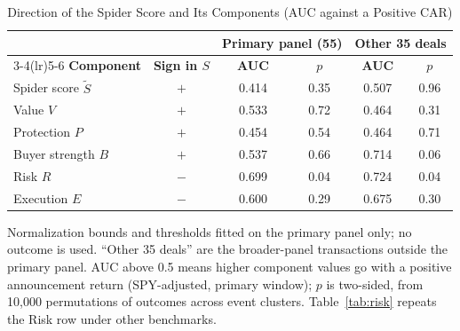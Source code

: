 \begin{table}[!t]
\caption{Direction of the Spider Score and Its Components (AUC against a Positive CAR)}
\label{tab:components}
\centering
\footnotesize
\setlength{\tabcolsep}{3pt}
\begin{tabular}{lccccc}
\toprule
 & & \multicolumn{2}{c}{\textbf{Primary panel (55)}} & \multicolumn{2}{c}{\textbf{Other 35 deals}} \\
\cmidrule(lr){3-4}\cmidrule(lr){5-6}
\textbf{Component} & \textbf{Sign in $S$} & \textbf{AUC} & \textbf{$p$} & \textbf{AUC} & \textbf{$p$} \\
\midrule
Spider score $\tilde S$ & $+$ & 0.414 & 0.35 & 0.507 & 0.96 \\
Value $V$ & $+$ & 0.533 & 0.72 & 0.464 & 0.31 \\
Protection $P$ & $+$ & 0.454 & 0.54 & 0.464 & 0.71 \\
Buyer strength $B$ & $+$ & 0.537 & 0.66 & 0.714 & 0.06 \\
Risk $R$ & $-$ & 0.699 & 0.04 & 0.724 & 0.04 \\
Execution $E$ & $-$ & 0.600 & 0.29 & 0.675 & 0.30 \\
\bottomrule
\end{tabular}
\par\vspace{2pt}\parbox{0.94\columnwidth}{\scriptsize Normalization bounds and thresholds fitted on the primary panel only; no outcome
is used. ``Other 35 deals'' are the broader-panel transactions outside the primary panel. AUC above 0.5 means
higher component values go with a positive announcement return (SPY-adjusted, primary window); $p$ is two-sided, from
10,000 permutations of outcomes across event clusters. Table~\ref{tab:risk} repeats the Risk row under other benchmarks.}
\end{table}
